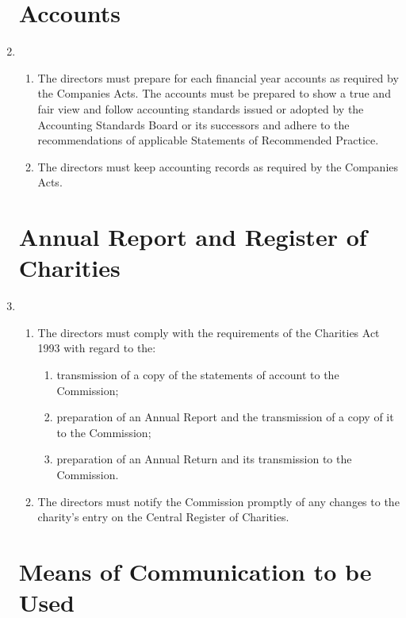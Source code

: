 \begin{enumerate}
\section{Accounts}

\item
  \begin{enumerate}
  \item
    The directors must prepare for each financial year accounts as
    required by the Companies Acts. The accounts must be prepared to
    show a true and fair view and follow accounting standards issued or
    adopted by the Accounting Standards Board or its successors and
    adhere to the recommendations of applicable Statements of
    Recommended Practice.
  \item
    The directors must keep accounting records as required by the
    Companies Acts.
  \end{enumerate}

\section{Annual Report and Register of Charities}

\item
  \begin{enumerate}
  \item
    The directors must comply with the requirements of the Charities
    Act 1993 with regard to the:
    \begin{enumerate}
    \item
      transmission of a copy of the statements of account to the
      Commission;
    \item
      preparation of an Annual Report and the transmission of a copy of
      it to the Commission;
    \item
      preparation of an Annual Return and its transmission to the
      Commission.
    \end{enumerate}
  \item
    The directors must notify the Commission promptly of any changes to
    the charity's entry on the Central Register of Charities.
  \end{enumerate}

\section{Means of Communication to be Used}


\end{enumerate}
